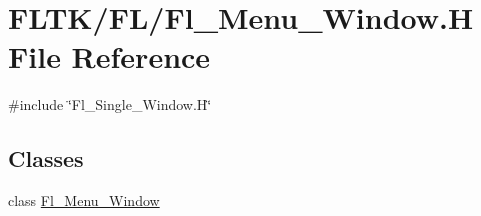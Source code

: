 \hypertarget{_fl___menu___window_8_h}{}\section{F\+L\+T\+K/\+F\+L/\+Fl\+\_\+\+Menu\+\_\+\+Window.H File Reference}
\label{_fl___menu___window_8_h}
{\ttfamily \#include \char`\"{}Fl\+\_\+\+Single\+\_\+\+Window.\+H\char`\"{}}\newline
\subsection*{Classes}
\begin{DoxyCompactItemize}
\item 
class \hyperlink{class_fl___menu___window}{Fl\+\_\+\+Menu\+\_\+\+Window}
\end{DoxyCompactItemize}
